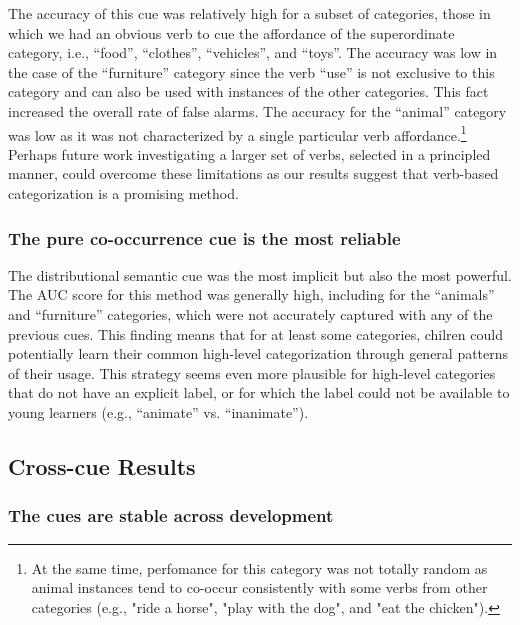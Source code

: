 \documentclass[10pt, letterpaper]{article}
\begin{document}
The accuracy of this cue was relatively high for a subset of categories,
those in which we had an obvious verb to cue the affordance of the
superordinate category, i.e., ``food'', ``clothes'', ``vehicles'', and
``toys''. The accuracy was low in the case of the ``furniture'' category
since the verb ``use'' is not exclusive to this category and can also be
used with instances of the other categories. This fact increased the
overall rate of false alarms. The accuracy for the ``animal'' category
was low as it was not characterized by a single particular verb
affordance.\footnote{At the same time, perfomance for this category was not totally random as animal instances tend to co-occur consistently with some verbs from other categories (e.g., "ride a horse", "play with the dog", and "eat the chicken").}
Perhaps future work investigating a larger set of verbs, selected in a
principled manner, could overcome these limitations as our results
suggest that verb-based categorization is a promising method.

\hypertarget{the-pure-co-occurrence-cue-is-the-most-reliable}{%
\subsubsection{The pure co-occurrence cue is the most
reliable}\label{the-pure-co-occurrence-cue-is-the-most-reliable}}

The distributional semantic cue was the most implicit but also the most
powerful. The AUC score for this method was generally high, including
for the ``animals'' and ``furniture'' categories, which were not
accurately captured with any of the previous cues. This finding means
that for at least some categories, chilren could potentially learn their
common high-level categorization through general patterns of their
usage. This strategy seems even more plausible for high-level categories
that do not have an explicit label, or for which the label could not be
available to young learners (e.g., ``animate'' vs. ``inanimate'').

\hypertarget{cross-cue-results}{%
\subsection{Cross-cue Results}\label{cross-cue-results}}

\hypertarget{the-cues-are-stable-across-development}{%
\subsubsection{The cues are stable across
development}\label{the-cues-are-stable-across-development}}
\end{document}
